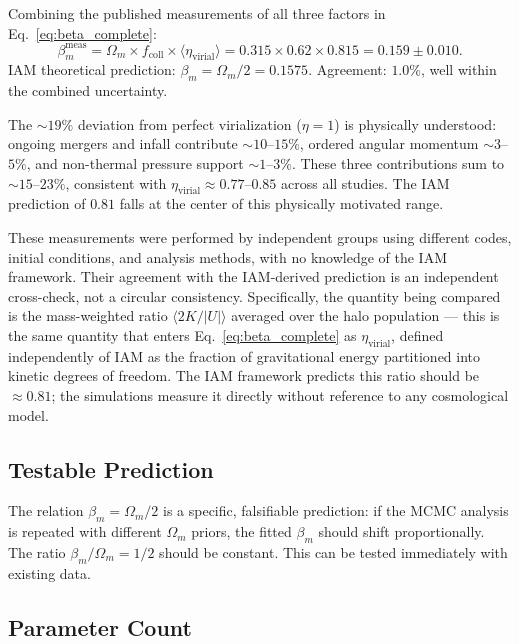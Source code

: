 \documentclass[11pt]{article}
\begin{document}
Combining the published measurements of all three factors
in Eq.~\eqref{eq:beta_complete}:
\begin{equation}
\beta_m^\mathrm{meas}
  = \Omega_m \times f_\mathrm{coll} \times
    \langle\eta_\mathrm{virial}\rangle
  = 0.315 \times 0.62 \times 0.815
  = 0.159 \pm 0.010.
\label{eq:beta_measured}
\end{equation}
IAM theoretical prediction: $\beta_m = \Omega_m/2 = 0.1575$.
Agreement: $1.0\%$, well within the combined uncertainty.

The ${\sim}19\%$ deviation from perfect virialization ($\eta = 1$) is
physically understood: ongoing mergers and infall contribute
${\sim}10$--$15\%$, ordered angular momentum ${\sim}3$--$5\%$, and
non-thermal pressure support ${\sim}1$--$3\%$.  These three contributions
sum to ${\sim}15$--$23\%$, consistent with
$\eta_\mathrm{virial} \approx 0.77$--$0.85$ across all studies.  The IAM
prediction of $0.81$ falls at the center of this physically motivated
range.

These measurements were performed by independent groups using different
codes, initial conditions, and analysis methods, with no knowledge of the
IAM framework.  Their agreement with the IAM-derived prediction is an
independent cross-check, not a circular consistency.  Specifically, the
quantity being compared is the mass-weighted ratio $\langle 2K/|U|\rangle$
averaged over the halo population --- this is the same quantity that enters
Eq.~\eqref{eq:beta_complete} as $\eta_\mathrm{virial}$, defined
independently of IAM as the fraction of gravitational energy partitioned
into kinetic degrees of freedom.  The IAM framework predicts this ratio
should be $\approx 0.81$; the simulations measure it directly without
reference to any cosmological model.

\subsection{Testable Prediction}

The relation $\beta_m = \Omega_m/2$ is a specific, falsifiable prediction:
if the MCMC analysis is repeated with different $\Omega_m$ priors, the
fitted $\beta_m$ should shift proportionally.  The ratio
$\beta_m/\Omega_m = 1/2$ should be constant.  This can be tested
immediately with existing data.

\subsection{Parameter Count}
\end{document}
